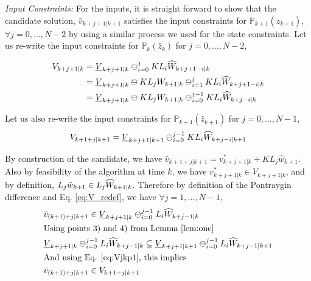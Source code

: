 \textit{Input Constraints:} For the inputs, it is straight forward to show that the candidate solution, $\bar{v}_{k+j+1|k+1}$ satisfies the input constraints for $\mathbb{P}_{k+1}(\hat{z}_{k+1}) $, $\forall j=0,\dotsc,N-2$ by using a similar process we used for the state constraints. Let us re-write the input constraints for $\mathbb{P}_{k}(\hat{z}_{k})$ for $j=0,\dotsc,N-2$,

\begin{subequations}
\label{eq:V_redef}
\begin{align}
V_{k+j+1|k}&=\underline{V}_{k+j+1|k} \ominus_{i=0}^{j} KL_i\widehat{W}_{k+j+1-i|k} \\
&=\underline{V}_{k+j+1|k} \ominus KL_jW_{k+1|k} \ominus_{i=1}^{j} KL_i\widehat{W}_{k+j+1-i|k} \\
&=\underline{V}_{k+j+1|k} \ominus KL_jW_{k+1|k} \ominus_{i=0}^{j-1} KL_i\widehat{W}_{k+j-i|k}
\end{align}
\end{subequations}

Let us also re-write the input constraints for $\mathbb{P}_{k+1}(\hat{z}_{k+1})$ for $j=0,\dotsc,N-1$,
\begin{equation}
\label{eq:Vjkp1}
V_{k+1+j|k+1}=\underline{V}_{k+j+1|k+1} \ominus_{i=0}^{j-1} KL_i\widehat{W}_{k+j-i|k+1}
\end{equation}

By construction of the candidate, we have $\bar{v}_{k+1+j|k+1}=v^{*}_{k+j+1|k}+KL_j\hat{w}_{k+1}$. Also by feasibility of the algorithm at time $k$, we have $v^{*}_{k+j+1|k} \in V_{k+j+1|k}$, and by definition, $L_j\hat{w}_{k+1} \in L_j\widehat{W}_{k+1|k}$. Therefore by definition of the Pontraygin difference and Eq. \ref{eq:V_redef}, we have $\forall j=1,\dotsc,N-1$,
\begin{subequations}
\begin{align}
&\bar{v}_{(k+1)+j|k+1} \in \underline{V}_{k+j+1|k} \ominus_{i=0}^{j-1}L_i\widehat{W}_{k+j-1|k} \\
&\text{Using points 3) and 4) from Lemma \ref{lem:one}} \nonumber \\
&\underline{V}_{k+j+1|k} \ominus_{i=0}^{j-1}L_i\widehat{W}_{k+j-1|k} \subseteq \underline{V}_{k+j+1|k+1} \ominus_{i=0}^{j-1}L_i\widehat{W}_{k+j-1|k+1} \\
&\text{And using Eq. \ref{eq:Vjkp1}, this implies} \nonumber \\
&\bar{v}_{(k+1)+j|k+1} \in V_{k+1+j|k+1}
\end{align}
\end{subequations}

